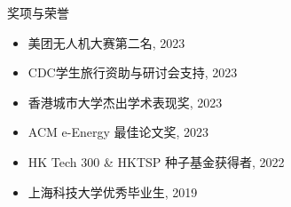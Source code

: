 \documentclass{resume} %
\begin{document}
\begin{rSection}{奖项与荣誉}

    \begin{multicols}{2} 
    \begin{itemize}
        \item 美团无人机大赛第二名, 2023
        \item CDC学生旅行资助与研讨会支持, 2023
        \item 香港城市大学杰出学术表现奖, 2023
        \item ACM e-Energy 最佳论文奖, 2023
        \item HK Tech 300 \& HKTSP 种子基金获得者, 2022
        \item 上海科技大学优秀毕业生, 2019
    \end{itemize}
    \end{multicols}  %
    \vspace{-5mm}
\end{rSection}





\end{document}
